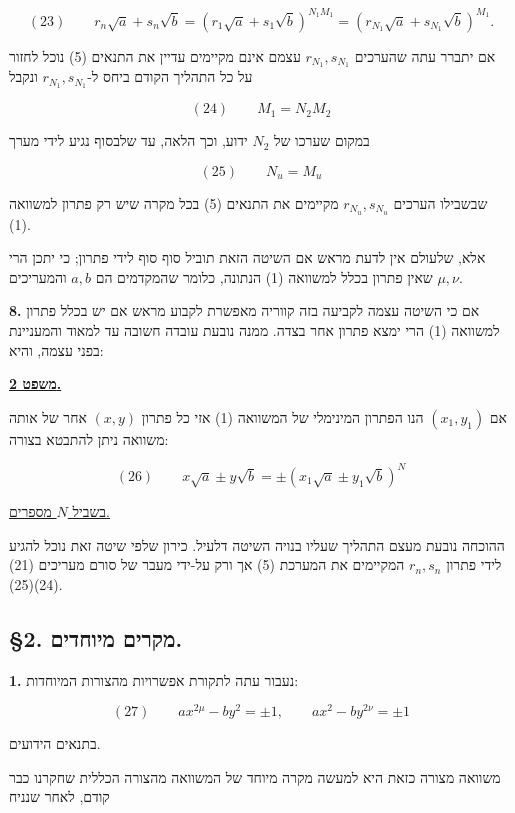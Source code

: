 \[ (23) \qquad r_n\sqrt{a} + s_n\sqrt{b} = (r_1\sqrt{a} + s_1\sqrt{b})^{N_1 M_1}
= (r_{N_1}\sqrt{a} + s_{N_1}\sqrt{b})^{M_1} . \]

\noindent אם יתברר עתה שהערכים $r_{N_1}, s_{N_1}$ עצמם אינם מקיימים עדיין את
התנאים (5) נוכל לחזור על כל התהליך הקודם ביחס ל-$r_{N_1}, s_{N_1}$ ונקבל

\[ (24) \qquad M_1 = N_2 M_2 \]

במקום שערכו של $N_2$ ידוע, וכך הלאה, עד שלבסוף נגיע לידי מערך

\[ (25) \qquad N_u = M_u \]

שבשבילו הערכים $r_{N_u}, s_{N_u}$ מקיימים את התנאים (5) בכל מקרה
שיש רק פתרון למשוואה (1).

אלא, שלעולם אין לדעת מראש אם השיטה הזאת תוביל סוף סוף לידי פתרון;
כי יתכן הרי שאין פתרון בכלל למשוואה (1) הנתונה, כלומר שהמקדמים
הם $a, b$ והמעריכים $\mu, \nu$.

\noindent\textbf{8.} אם כי השיטה עצמה לקביעה בזה קווריה %
מאפשרת לקבוע מראש אם יש
בכלל פתרון למשוואה (1) הרי ימצא פתרון אחר בצדה. ממנה נובעת עובדה
חשובה עד למאוד והמעניינת בפני עצמה, והיא:

\noindent\textbf{\underline{משפט 2.}}

אם $(x_1, y_1)$ הנו הפתרון המינימלי של המשוואה (1) אזי כל פתרון
$(x, y)$ אחר של אותה משוואה ניתן להתבטא בצורה:

\[ (26) \qquad x\sqrt{a} \pm y\sqrt{b} = \pm(x_1\sqrt{a} \pm y_1\sqrt{b})^N \]

\underline{בשביל $N$ מספרים.}

ההוכחה נובעת מעצם התהליך שעליו בנויה השיטה דלעיל. כירון %
שלפי שיטה
זאת נוכל להגיע לידי פתרון $r_n, s_n$ המקיימים את המערכת (5) אך ורק
על-ידי מעבר של סורם %
מעריכים (21)(24)(25).

\subsection*{\S2. מקרים מיוחדים.}

\noindent\textbf{1.} נעבור עתה לתקורת %
אפשרויות מהצורות המיוחדות:

\[ (27) \qquad ax^{2\mu} - by^2 = \pm 1 , \qquad ax^2 - by^{2\nu} = \pm 1 \]

בתנאים הידועים.

משוואה מצורה כזאת היא למעשה מקרה מיוחד של המשוואה מהצורה הכללית
שחקרנו כבר קודם, לאחר שנניח


